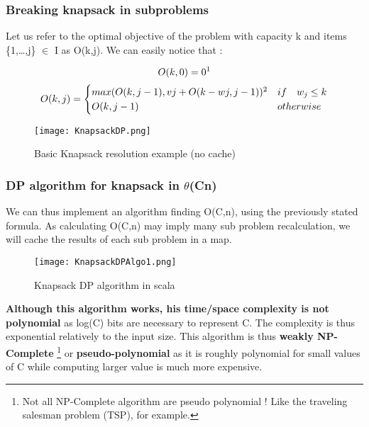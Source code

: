 \subsubsection{Breaking knapsack in subproblems}

Let us refer to the optimal objective of the problem with capacity k and
items \{1,…,j\} $\in$ I as O(k,j). We can easily notice that :

\[ O(k,0) = 0 \text{\footnotemark}\]
\[ O(k,j) = \begin{cases} 
      max(O(k,j-1) , vj +O(k-wj,j-1))\text{\footnotemark} & if \quad w_j \leq k \\
      O(k,j-1) & otherwise
   \end{cases}
\]

\begin{figure}[!ht]
    \centering
    \texttt{[image: KnapsackDP.png]}
    \caption{Basic Knapsack resolution example (no cache)}
    \label{fig:Knapsack_example}
\end{figure}
\FloatBarrier

\subsubsection{DP algorithm for knapsack in $\theta$(Cn)}

We can thus implement an algorithm finding O(C,n), using the previously 
stated formula. As calculating O(C,n) may imply many sub problem recalculation,
we will cache the results of each sub problem in a map.

\begin{figure}[!ht]
    \centering
    \texttt{[image: KnapsackDPAlgo1.png]}
    \caption{Knapsack DP algorithm in scala}
    \label{fig:Knapsack_example}
\end{figure}
\FloatBarrier

\textbf{Although this algorithm works, his time/space complexity is not polynomial} 
as log(C) bits are necessary to represent C. The complexity is thus exponential
relatively to the input size. This algorithm is thus \textbf{weakly NP-Complete}
\footnote{Not all NP-Complete algorithm are pseudo polynomial ! Like the 
traveling salesman problem (TSP), for example.} or 
\textbf{pseudo-polynomial} as it is roughly polynomial for small values of C while 
computing larger value is much more expensive. \newline

